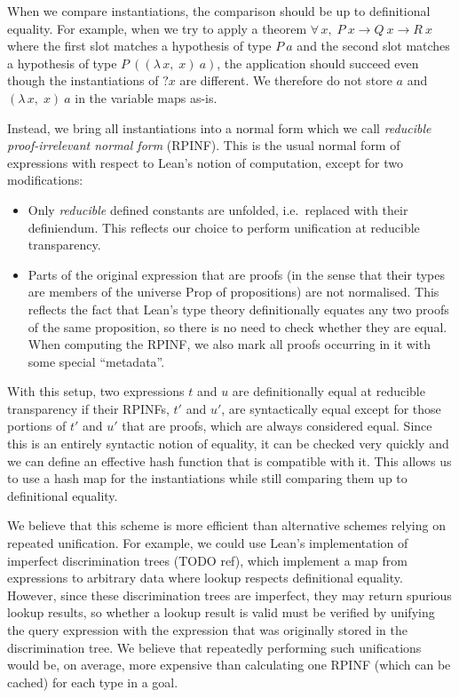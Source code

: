 \documentclass[runningheads]{llncs}
\newcommand{\Lam}[2]{\ensuremath{\lambda\, #1,\; #2}}
\newcommand{\All}[2]{\ensuremath{\forall\, #1,\; #2}}
\newcommand{\mvar}[1]{\ensuremath{?#1}}
\newcommand{\Prop}{\ensuremath{\mathrm{Prop}}}
\begin{document}
When we compare instantiations, the comparison should be up to definitional equality.
For example, when we try to apply a theorem $\All{x}{P~x → Q~x → R~x}$ where the first slot matches a hypothesis of type $P~a$ and the second slot matches a hypothesis of type $P~((\Lam{x}{x})~a)$, the application should succeed even though the instantiations of $\mvar{x}$ are different.
We therefore do not store $a$ and $(\Lam{x}{x})~a$ in the variable maps as-is.

Instead, we bring all instantiations into a normal form which we call \emph{reducible proof-irrelevant normal form} (RPINF).
This is the usual normal form of expressions with respect to Lean's notion of computation, except for two modifications:
\begin{itemize}
  \item Only \emph{reducible} defined constants are unfolded, i.e.\ replaced with their definiendum.
        This reflects our choice to perform unification at reducible transparency.
  \item Parts of the original expression that are proofs (in the sense that their types are members of the universe $\Prop$ of propositions) are not normalised.
        This reflects the fact that Lean's type theory definitionally equates any two proofs of the same proposition, so there is no need to check whether they are equal.
        When computing the RPINF, we also mark all proofs occurring in it with some special \enquote{metadata}.
\end{itemize}

With this setup, two expressions $t$ and $u$ are definitionally equal at reducible transparency if their RPINFs, $t'$ and $u'$, are syntactically equal except for those portions of $t'$ and $u'$ that are proofs, which are always considered equal.
Since this is an entirely syntactic notion of equality, it can be checked very quickly and we can define an effective hash function that is compatible with it.
This allows us to use a hash map for the instantiations while still comparing them up to definitional equality.

We believe that this scheme is more efficient than alternative schemes relying on repeated unification.
For example, we could use Lean's implementation of imperfect discrimination trees (TODO ref), which implement a map from expressions to arbitrary data where lookup respects definitional equality.
However, since these discrimination trees are imperfect, they may return spurious lookup results, so whether a lookup result is valid must be verified by unifying the query expression with the expression that was originally stored in the discrimination tree.
We believe that repeatedly performing such unifications would be, on average, more expensive than calculating one RPINF (which can be cached) for each type in a goal.
\end{document}
